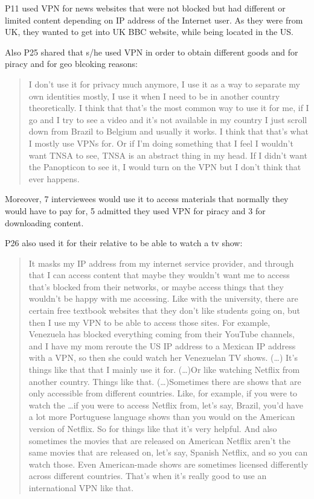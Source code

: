 P11 used VPN for news websites that were not blocked but had different or
limited content depending on IP address of the Internet user. As they were
from UK, they wanted to get into UK BBC website, while being located in the
US.

Also P25 shared that s/he used VPN in order to obtain different goods and for
piracy and for geo blcoking reasons: \begin{quote}I don't use it for privacy
much anymore, I use it as a way to separate my own identities mostly, I use it
when I need to be in another country theoretically. I think that that's the
most common way to use it for me, if I go and I try to see a video and it's
not available in my country I just scroll down from Brazil to Belgium and
usually it works. I think that that's what I mostly use VPNs for. Or if I'm
doing something that I feel I wouldn't want TNSA to see, TNSA is an abstract
thing in my head. If I didn't want the Panopticon to see it, I would turn on
the VPN but I don't think that ever happens.\end{quote}

Moreover, 7 interviewees would use it to access materials that normally they
would have to pay for, 5 admitted they used VPN for piracy and 3 for
downloading content.

P26 also used it for their relative to be able to watch a tv show:
\begin{quote}It masks my IP address from my internet service provider, and
    through that I can access content that maybe they wouldn't want me to
    access that's blocked from their networks, or maybe access things that
    they wouldn't be happy with me accessing. Like with the university, there
    are certain free textbook websites that they don't like students going on,
    but then I use my VPN to be able to access those sites. For example,
    Venezuela has blocked everything coming from their YouTube channels, and I
    have my mom reroute the US IP address to a Mexican IP address with a VPN,
    so then she could watch her Venezuelan TV shows. (\dots) It's things like
    that that I mainly use it for.  (\dots)Or like watching Netflix from
another country. Things like that. (\dots)Sometimes there are shows that are
only accessible from different countries. Like, for example, if you were to
watch the \dots if you were to access Netflix from, let's say, Brazil, you'd
have a lot more Portuguese language shows than you would on the American
version of Netflix. So for things like that it's very helpful. And also
sometimes the movies that are released on American Netflix aren't the same
movies that are released on, let's say, Spanish Netflix, and so you can watch
those. Even American-made shows are sometimes licensed differently across
different countries. That's when it's really good to use an international VPN
like that.\end{quote}

